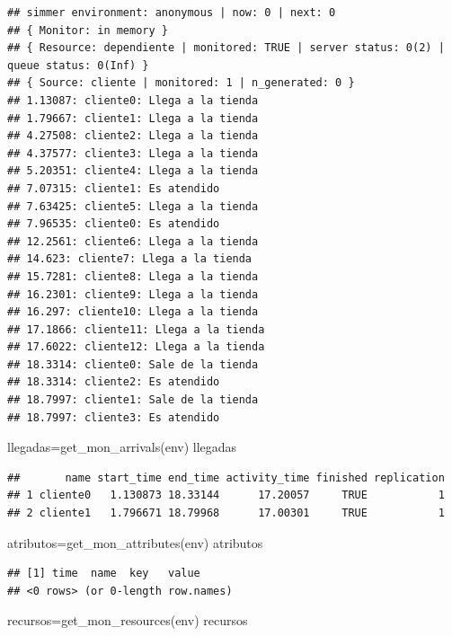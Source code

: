 \documentclass[
]{book}
\newenvironment{Shaded}{\begin{snugshade}}{\end{snugshade}}
\newcommand{\FunctionTok}[1]{\textcolor[rgb]{0.00,0.00,0.00}{#1}}
\newcommand{\NormalTok}[1]{#1}
\newcommand{\OtherTok}[1]{\textcolor[rgb]{0.56,0.35,0.01}{#1}}
\theoremstyle{definition}
\theoremstyle{definition}
\theoremstyle{definition}
\theoremstyle{definition}
\theoremstyle{remark}
\begin{document}
\begin{verbatim}
## simmer environment: anonymous | now: 0 | next: 0
## { Monitor: in memory }
## { Resource: dependiente | monitored: TRUE | server status: 0(2) | queue status: 0(Inf) }
## { Source: cliente | monitored: 1 | n_generated: 0 }
## 1.13087: cliente0: Llega a la tienda
## 1.79667: cliente1: Llega a la tienda
## 4.27508: cliente2: Llega a la tienda
## 4.37577: cliente3: Llega a la tienda
## 5.20351: cliente4: Llega a la tienda
## 7.07315: cliente1: Es atendido
## 7.63425: cliente5: Llega a la tienda
## 7.96535: cliente0: Es atendido
## 12.2561: cliente6: Llega a la tienda
## 14.623: cliente7: Llega a la tienda
## 15.7281: cliente8: Llega a la tienda
## 16.2301: cliente9: Llega a la tienda
## 16.297: cliente10: Llega a la tienda
## 17.1866: cliente11: Llega a la tienda
## 17.6022: cliente12: Llega a la tienda
## 18.3314: cliente0: Sale de la tienda
## 18.3314: cliente2: Es atendido
## 18.7997: cliente1: Sale de la tienda
## 18.7997: cliente3: Es atendido
\end{verbatim}

\begin{Shaded}
\begin{Highlighting}[]
\NormalTok{llegadas}\OtherTok{=}\FunctionTok{get\_mon\_arrivals}\NormalTok{(env) }
\NormalTok{llegadas}
\end{Highlighting}
\end{Shaded}

\begin{verbatim}
##       name start_time end_time activity_time finished replication
## 1 cliente0   1.130873 18.33144      17.20057     TRUE           1
## 2 cliente1   1.796671 18.79968      17.00301     TRUE           1
\end{verbatim}

\begin{Shaded}
\begin{Highlighting}[]
\NormalTok{atributos}\OtherTok{=}\FunctionTok{get\_mon\_attributes}\NormalTok{(env)}
\NormalTok{atributos}
\end{Highlighting}
\end{Shaded}

\begin{verbatim}
## [1] time  name  key   value
## <0 rows> (or 0-length row.names)
\end{verbatim}

\begin{Shaded}
\begin{Highlighting}[]
\NormalTok{recursos}\OtherTok{=}\FunctionTok{get\_mon\_resources}\NormalTok{(env)}
\NormalTok{recursos}
\end{Highlighting}
\end{Shaded}
\end{document}
